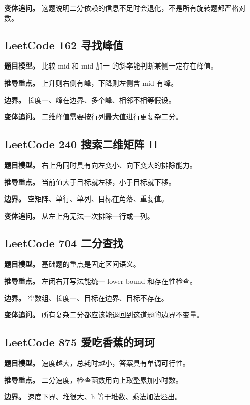 \textbf{变体追问。} 这题说明二分依赖的信息不足时会退化，不是所有旋转题都严格对数。

\subsection{LeetCode 162 寻找峰值}

\textbf{题目模型。} 比较 mid 和 mid 加一 的斜率能判断某侧一定存在峰值。

\textbf{推导重点。} 上升则右侧有峰，下降则左侧含 mid 有峰。

\textbf{边界。} 长度一、峰在边界、多个峰、相邻不相等假设。

\textbf{变体追问。} 二维峰值需要按行列最大值进行更复杂二分。

\subsection{LeetCode 240 搜索二维矩阵 II}

\textbf{题目模型。} 右上角同时具有向左变小、向下变大的排除能力。

\textbf{推导重点。} 当前值大于目标就左移，小于目标就下移。

\textbf{边界。} 空矩阵、单行、单列、目标在角落、重复值。

\textbf{变体追问。} 从左上角无法一次排除一行或一列。

\subsection{LeetCode 704 二分查找}

\textbf{题目模型。} 基础题的重点是固定区间语义。

\textbf{推导重点。} 左闭右开写法能统一 lower bound 和存在性检查。

\textbf{边界。} 空数组、长度一、目标在边界、目标不存在。

\textbf{变体追问。} 所有复杂二分都应该能退回到这道题的边界不变量。

\subsection{LeetCode 875 爱吃香蕉的珂珂}

\textbf{题目模型。} 速度越大，总耗时越小，答案具有单调可行性。

\textbf{推导重点。} 二分速度，检查函数用向上取整累加小时数。

\textbf{边界。} 速度下界、堆很大、h 等于堆数、乘法加法溢出。

